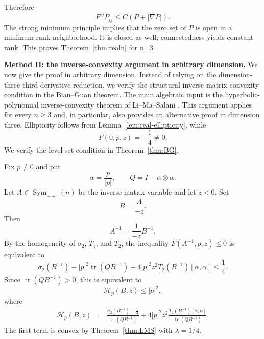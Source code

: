 \documentclass{article}
\newcommand{\Sym}{\operatorname{Sym}}
\newcommand{\tr}{\operatorname{tr}}
\numberwithin{equation}{section}
\begin{document}
Therefore
\[
F^{ij}P_{ij}\le C(P+|\nabla P|).
\]
The strong minimum principle implies that the zero set of $P$ is open in a minimum-rank neighborhood. It is closed as well; connectedness yields constant rank. This proves Theorem~\ref{thm:realn} for n=3.

\medskip
\noindent\textbf{Method II: the inverse-convexity argument in arbitrary
dimension.}
We now give the proof in arbitrary dimension. Instead of relying on the
dimension-three third-derivative reduction, we verify the structural
inverse-matrix convexity condition in the Bian--Guan theorem. The main
algebraic input is the hyperbolic-polynomial inverse-convexity theorem of
Li--Ma--Salani \cite{LMS26}. This argument applies for every $n\ge3$ and, in
particular, also provides an alternative proof in dimension three. Ellipticity follows from Lemma~\ref{lem:real-ellipticity}, while
\begin{equation}\label{eq:F0real}
F(0,p,z)=-\frac14\neq0.
\end{equation}
We verify the level-set condition in Theorem~\ref{thm:BG}.

Fix $p\neq0$ and put
\begin{equation}\label{eq:alpha-real-method2}
\alpha=\frac{p}{|p|},
\qquad
Q=I-\alpha\otimes\alpha.
\end{equation}
Let $A\in\Sym_{++}(n)$ be the inverse-matrix variable and let $z<0$. Set
\begin{equation}\label{eq:Bscale-real}
B=\frac{A}{-z}.
\end{equation}
Then
\[
A^{-1}=\frac1{-z}B^{-1}.
\]
By the homogeneity of $\sigma_2$, $T_1$, and $T_2$, the inequality $F(A^{-1},p,z)\le0$ is equivalent to
\begin{equation}\label{eq:real-level1}
\sigma_2(B^{-1})
-|p|^2\tr(QB^{-1})
+4|p|^2z^2T_2(B^{-1})[\alpha,\alpha]
\le\frac14.
\end{equation}
Since $\tr(QB^{-1})>0$, this is equivalent to
\begin{equation}\label{eq:Hreal-level}
\mathcal H_p(B,z)\le|p|^2,
\end{equation}
where
\begin{align}
\mathcal H_p(B,z)
={}&
\frac{\sigma_2(B^{-1})-\frac14}{\tr(QB^{-1})}
+4|p|^2z^2
\frac{T_2(B^{-1})[\alpha,\alpha]}{\tr(QB^{-1})}.
\label{eq:Hreal}
\end{align}
The first term is convex by Theorem~\ref{thm:LMS} with $\lambda=1/4$.
\end{document}
